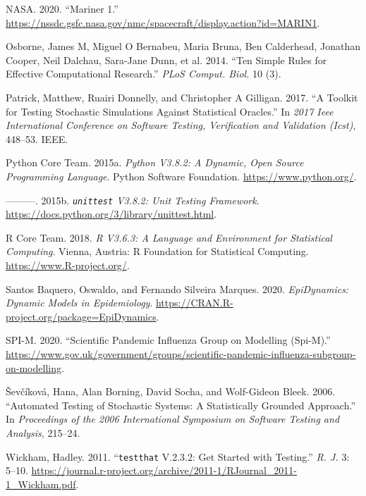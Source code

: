 \documentclass[
]{article}
\begin{document}
\leavevmode\hypertarget{ref-nasa}{}%
NASA. 2020. ``Mariner 1.'' \url{https://nssdc.gsfc.nasa.gov/nmc/spacecraft/display.action?id=MARIN1}.

\leavevmode\hypertarget{ref-osborne2014ten}{}%
Osborne, James M, Miguel O Bernabeu, Maria Bruna, Ben Calderhead, Jonathan Cooper, Neil Dalchau, Sara-Jane Dunn, et al. 2014. ``Ten Simple Rules for Effective Computational Research.'' \emph{PLoS Comput. Biol.} 10 (3).

\leavevmode\hypertarget{ref-patrick2017toolkit}{}%
Patrick, Matthew, Ruairi Donnelly, and Christopher A Gilligan. 2017. ``A Toolkit for Testing Stochastic Simulations Against Statistical Oracles.'' In \emph{2017 Ieee International Conference on Software Testing, Verification and Validation (Icst)}, 448--53. IEEE.

\leavevmode\hypertarget{ref-python}{}%
Python Core Team. 2015a. \emph{\textup{Python} V3.8.2: A Dynamic, Open Source Programming Language}. Python Software Foundation. \url{https://www.python.org/}.

\leavevmode\hypertarget{ref-pythonunittest}{}%
---------. 2015b. \emph{\texttt{unittest} V3.8.2: Unit Testing Framework}. \url{https://docs.python.org/3/library/unittest.html}.

\leavevmode\hypertarget{ref-R}{}%
R Core Team. 2018. \emph{\textup{R} V3.6.3: A Language and Environment for Statistical Computing}. Vienna, Austria: R Foundation for Statistical Computing. \url{https://www.R-project.org/}.

\leavevmode\hypertarget{ref-santos2015epidynamics}{}%
Santos Baquero, Oswaldo, and Fernando Silveira Marques. 2020. \emph{EpiDynamics: Dynamic Models in Epidemiology}. \url{https://CRAN.R-project.org/package=EpiDynamics}.

\leavevmode\hypertarget{ref-spim}{}%
SPI-M. 2020. ``Scientific Pandemic Influenza Group on Modelling (Spi-M).'' \url{https://www.gov.uk/government/groups/scientific-pandemic-influenza-subgroup-on-modelling}.

\leavevmode\hypertarget{ref-vsevvcikova2006automated}{}%
Ševčíková, Hana, Alan Borning, David Socha, and Wolf-Gideon Bleek. 2006. ``Automated Testing of Stochastic Systems: A Statistically Grounded Approach.'' In \emph{Proceedings of the 2006 International Symposium on Software Testing and Analysis}, 215--24.

\leavevmode\hypertarget{ref-testthat}{}%
Wickham, Hadley. 2011. ``\texttt{testthat} V.2.3.2: Get Started with Testing.'' \emph{R. J.} 3: 5--10. \url{https://journal.r-project.org/archive/2011-1/RJournal_2011-1_Wickham.pdf}.
\end{document}
